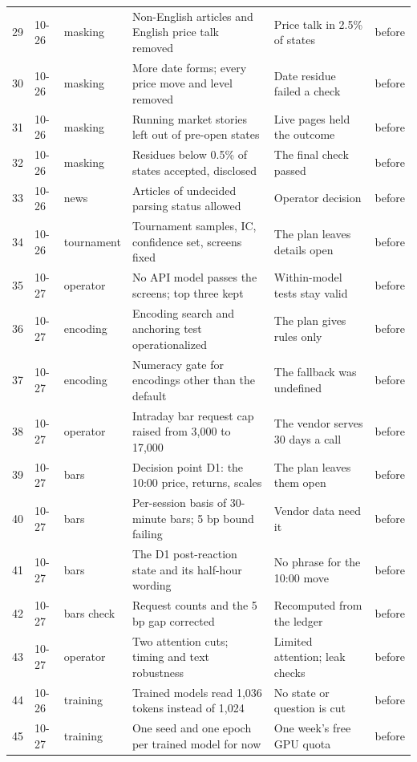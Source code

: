 \begin{longtable}{@{}rll>{\raggedright\arraybackslash}p{2.85in}>{\raggedright\arraybackslash}p{1.7in}l@{}}
29 & 10-26 & masking & Non-English articles and English price talk removed & Price talk in 2.5\% of states & before \\
30 & 10-26 & masking & More date forms; every price move and level removed & Date residue failed a check & before \\
31 & 10-26 & masking & Running market stories left out of pre-open states & Live pages held the outcome & before \\
32 & 10-26 & masking & Residues below 0.5\% of states accepted, disclosed & The final check passed & before \\
33 & 10-26 & news & Articles of undecided parsing status allowed & Operator decision & before \\
34 & 10-26 & tournament & Tournament samples, IC, confidence set, screens fixed & The plan leaves details open & before \\
35 & 10-27 & operator & No API model passes the screens; top three kept & Within-model tests stay valid & before \\
36 & 10-27 & encoding & Encoding search and anchoring test operationalized & The plan gives rules only & before \\
37 & 10-27 & encoding & Numeracy gate for encodings other than the default & The fallback was undefined & before \\
38 & 10-27 & operator & Intraday bar request cap raised from 3,000 to 17,000 & The vendor serves 30 days a call & before \\
39 & 10-27 & bars & Decision point D1: the 10:00 price, returns, scales & The plan leaves them open & before \\
40 & 10-27 & bars & Per-session basis of 30-minute bars; 5 bp bound failing & Vendor data need it & before \\
41 & 10-27 & bars & The D1 post-reaction state and its half-hour wording & No phrase for the 10:00 move & before \\
42 & 10-27 & bars check & Request counts and the 5 bp gap corrected & Recomputed from the ledger & before \\
43 & 10-27 & operator & Two attention cuts; timing and text robustness & Limited attention; leak checks & before \\
44 & 10-26 & training & Trained models read 1,036 tokens instead of 1,024 & No state or question is cut & before \\
45 & 10-27 & training & One seed and one epoch per trained model for now & One week's free GPU quota & before \\

\end{longtable}
